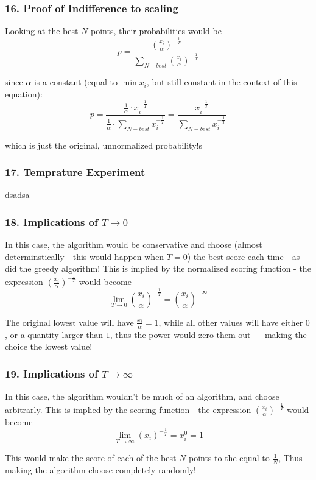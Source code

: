 \documentclass{article}
\begin{document}
\subsubsection*{16. Proof of Indifference to scaling}
Looking at the best $N$ points, their probabilities would be
$$
	p = \frac {\left(\frac {x_i}{\alpha}\right)^{-\frac{1}{T}}} {\sum_{N-best} {\left(\frac {x_i}{\alpha}\right)^{-\frac{1}{T}}}}
$$

since $\alpha$ is a constant (equal to $ \min x_i $, but still constant in the context of this equation):
$$
	p = \frac {\frac {1}{\alpha}\cdot x_i^{-\frac{1}{T}}} {\frac {1}{\alpha}\cdot \sum_{N-best} {x_i^{-\frac{1}{T}}}} = \frac {x_i^{-\frac{1}{T}}} {\sum_{N-best} {x_i^{-\frac{1}{T}}}}
$$

which is just the original, unnormalized probability!s

\subsubsection*{17. Temprature Experiment}
dsadsa

\subsubsection*{18. Implications of $T \rightarrow 0$}
In this case, the algorithm would be conservative and choose (almost determinstically - this would happen when $T=0$) the best score each time - as did the greedy algorithm!
This is implied by the normalized scoring function - the expression  $(\frac {x_i}{\alpha})^{-\frac{1}{T}}$ would become
$$
	\lim_{T \rightarrow 0} \left(\frac {x_i}{\alpha}\right)^{-\frac{1}{T}} = (\frac {x_i}{\alpha})^{-\infty}
$$

The original lowest value will have $\frac {x_i}{\alpha} = 1$, while all other values will have either $0$, or a quantity larger than $1$, thus the power would zero them out --- making the choice the lowest value!

\subsubsection*{19. Implications of $T \rightarrow \infty$}
In this case, the algorithm wouldn't be much of an algorithm, and choose arbitrarly.
This is implied by the scoring function - the expression  $(\frac {x_i}{\alpha})^{-\frac{1}{T}}$ would become
$$
	\lim_{T \rightarrow \infty} (x_i)^{-\frac{1}{T}} = x_i^0 = 1
$$

This would make the score of each of the best $N$ points to the equal to $\frac {1} {N}$, Thus making the algorithm choose completely randomly!
\end{document}
